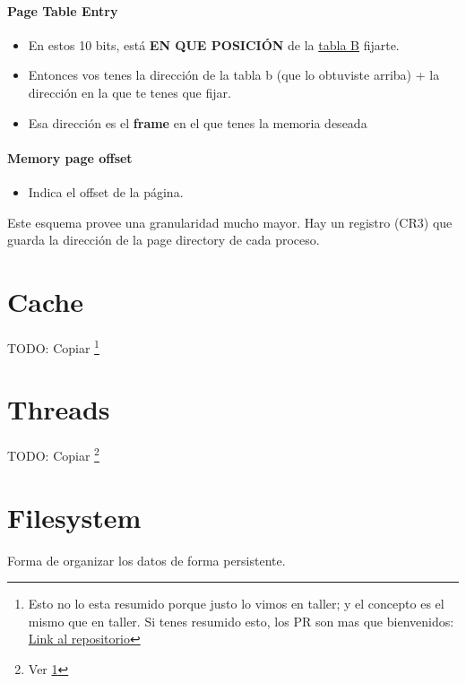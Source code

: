 \documentclass{article}
\begin{document}
\paragraph{Page Table Entry}\label{page-table-entry}

\begin{itemize}
\item
  En estos 10 bits, está \textbf{EN QUE POSICIÓN} de la \underline{tabla B}
  fijarte.
\item
  Entonces vos tenes la dirección de la tabla b (que lo obtuviste
  arriba) + la dirección en la que te tenes que fijar.
\item
  Esa dirección es el \textbf{frame} en el que tenes la memoria deseada
\end{itemize}

\paragraph{Memory page offset}\label{memory-page-offset}

\begin{itemize}
\item
  Indica el offset de la página.
\end{itemize}

Este esquema provee una granularidad mucho mayor. Hay un registro (CR3)
que guarda la dirección de la page directory de cada proceso.

\section{Cache}\label{cache}

TODO: Copiar \footnote{\label{notaTaller}Esto no lo esta resumido porque justo lo vimos en taller; y el concepto es el mismo que en taller. Si tenes resumido esto, los PR son mas que bienvenidos: \href{https://github.com/lima-limon-inc/Resumen-Sistemas-Operativos}{Link al repositorio}}

\section{Threads}\label{threads}
 TODO: Copiar \footnote{Ver \cref{notaTaller}}


\section{Filesystem}\label{filesystem}

Forma de organizar los datos de forma persistente.
\end{document}
